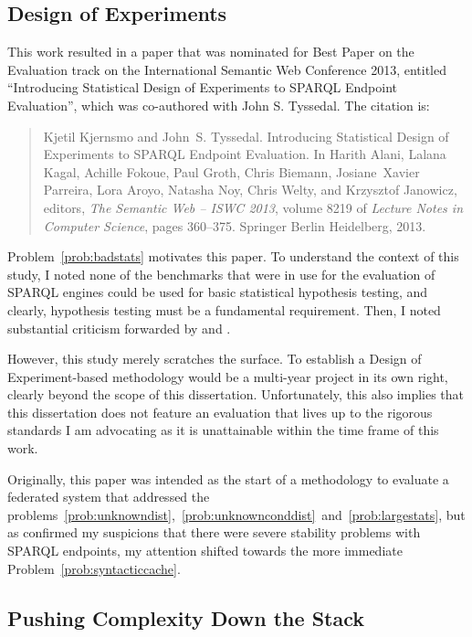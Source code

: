 \subsection{Design of Experiments}\label{sec:condoe}

This work resulted in a paper that was nominated for Best Paper on the
Evaluation track on the International Semantic Web Conference 2013,
entitled ``Introducing Statistical Design of Experiments to SPARQL
Endpoint Evaluation'', which was co-authored with John
S. Tyssedal. The citation is:

\begin{quote}
Kjetil Kjernsmo and John~S. Tyssedal.
\newblock Introducing Statistical Design of Experiments to SPARQL Endpoint
  Evaluation.
\newblock In Harith Alani, Lalana Kagal, Achille Fokoue, Paul Groth, Chris
  Biemann, Josiane~Xavier Parreira, Lora Aroyo, Natasha Noy, Chris Welty, and
  Krzysztof Janowicz, editors, {\em The Semantic Web – ISWC 2013}, volume
  8219 of {\em Lecture Notes in Computer Science}, pages 360--375. Springer
  Berlin Heidelberg, 2013.
\end{quote}


Problem~\ref{prob:badstats} motivates this paper. 
To understand the context of this study, I noted none of the
benchmarks that were in use for the evaluation of SPARQL engines could
be used for basic statistical hypothesis testing, and clearly,
hypothesis testing must be a fundamental requirement. Then, I noted
substantial criticism forwarded by
\cite{Duan:2011:AOC:1989323.1989340} and \cite{MontoyaVCRA12}.

However, this study merely scratches the surface. To establish a
Design of Experiment-based methodology would be a multi-year project
in its own right, clearly beyond the scope of this
dissertation. Unfortunately, this also implies that this dissertation
does not feature an evaluation that lives up to the rigorous standards
I am advocating as it is unattainable within the time frame of this
work.

Originally, this paper was intended as the start of a methodology to
evaluate a federated system that addressed the
problems~\ref{prob:unknowndist},~\ref{prob:unknownconddist}~and~\ref{prob:largestats},
but as \cite{buil2013sparql} confirmed my suspicions that there were
severe stability problems with SPARQL endpoints, my attention shifted
towards the more immediate Problem~\ref{prob:syntacticcache}.

\subsection{Pushing Complexity Down the Stack}\label{sec:conpush}

